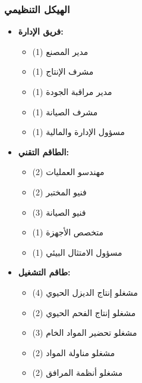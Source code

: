 \subsubsection{الهيكل التنظيمي}
\begin{itemize}
    \item \textbf{فريق الإدارة:}
    \begin{itemize}
        \item مدير المصنع (1)
        \item مشرف الإنتاج (1)
        \item مدير مراقبة الجودة (1)
        \item مشرف الصيانة (1)
        \item مسؤول الإدارة والمالية (1)
    \end{itemize}
    
    \item \textbf{الطاقم التقني:}
    \begin{itemize}
        \item مهندسو العمليات (2)
        \item فنيو المختبر (2)
        \item فنيو الصيانة (3)
        \item متخصص الأجهزة (1)
        \item مسؤول الامتثال البيئي (1)
    \end{itemize}
    
    \item \textbf{طاقم التشغيل:}
    \begin{itemize}
        \item مشغلو إنتاج الديزل الحيوي (4)
        \item مشغلو إنتاج الفحم الحيوي (2)
        \item مشغلو تحضير المواد الخام (3)
        \item مشغلو مناولة المواد (2)
        \item مشغلو أنظمة المرافق (2)
    \end{itemize}
\end{itemize}

